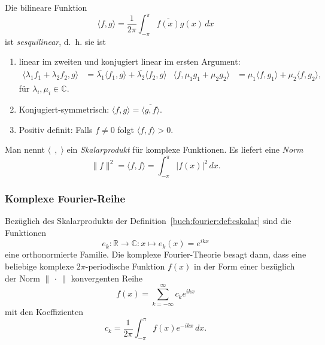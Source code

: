 \begin{definition}
\label{buch:fourier:def:cskalar}
Die bilineare Funktion
\[
\langle f,g\rangle
=
\frac{1}{2\pi}
\int_{-\pi}^\pi \overline{f(x)}g(x)\,dx
\]
ist {\em sesquilinear}, d.~h. sie ist
\begin{enumerate}
\item
linear im zweiten und konjugiert linear im ersten Argument:
\begin{align*}
\langle\lambda_1f_1+\lambda_2f_2,g\rangle
&=
\overline{\lambda_1}\langle f_1,g\rangle
+
\overline{\lambda_2}\langle f_2,g\rangle
&
\langle f,\mu_1g_1+\mu_2g_2\rangle
&=
\mu_1
\langle f,g_1\rangle
+
\mu_2
\langle f,g_2\rangle,
\end{align*}
für $\lambda_i,\mu_i\in\mathbb{C}$.
\item
Konjugiert-symmetrisch:
$\langle f,g\rangle=\overline{\langle g,f\rangle}$.
\item
Positiv definit: Falls $f\ne 0$ folgt
$\langle f,f\rangle > 0$.
\end{enumerate}
Man nennt
$\langle\;\,,\;\rangle$
ein {\em Skalarprodukt} für komplexe Funktionen.
Es liefert eine
{\em Norm}
\[
\|f\|^2
=
\langle f,f\rangle
=
\int_{-\pi}^{\pi} |f(x)|^2\,dx.
\]
\end{definition}

%
%
\subsubsection{Komplexe Fourier-Reihe}
Bezüglich des Skalarprodukts
der Definition~\ref{buch:fourier:def:cskalar}
sind die Funktionen
\[
e_k
:
\mathbb{R} \to \mathbb{C}
\colon
x\mapsto e_k(x)=e^{ikx}
\]
eine orthonormierte Familie.
Die komplexe Fourier-Theorie besagt dann,
dass eine beliebige komplexe $2\pi$-periodische Funktion $f(x)$ 
in der Form einer bezüglich der Norm $\|\,\cdot\,\|$ konvergenten Reihe
\begin{equation}
f(x)
=
\sum_{k=-\infty}^\infty c_ke^{ikx}
\label{buch:fourier:eqn:cfourierreihe}
\end{equation}
mit den Koeffizienten
\[
c_k
=
\frac{1}{2\pi}
\int_{-\pi}^\pi
f(x) e^{-ikx}\,dx.
\]

